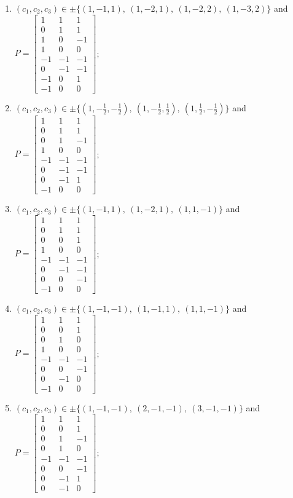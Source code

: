 \begin{enumerate}
\item[(d31)\,\newitem] $(c_1,c_2,c_3)\in \pm\{(1,-1,1),\allowbreak\ (1,-2,1),\allowbreak\ (1,-2,2),\allowbreak\ (1,-3,2)\}$ and $P=\begin{bmatrix}1&1&1\\0&1&1\\1&0&-1\\1&0&0\\-1&-1&-1\\0&-1&-1\\-1&0&1\\-1&0&0\end{bmatrix}$;
\item[(d32)\,\newitem] $(c_1,c_2,c_3)\in \pm\{(1,-\tfrac{1}{2},-\tfrac{1}{2}),\allowbreak\ (1,-\tfrac{1}{2},\tfrac{1}{2}),\allowbreak\ (1,\tfrac{1}{2},-\tfrac{1}{2})\}$ and $P=\begin{bmatrix}1&1&1\\0&1&1\\0&1&-1\\1&0&0\\-1&-1&-1\\0&-1&-1\\0&-1&1\\-1&0&0\end{bmatrix}$;
\item[(d33)\,\newitem] $(c_1,c_2,c_3)\in \pm\{(1,-1,1),\allowbreak\ (1,-2,1),\allowbreak\ (1,1,-1)\}$ and $P=\begin{bmatrix}1&1&1\\0&1&1\\0&0&1\\1&0&0\\-1&-1&-1\\0&-1&-1\\0&0&-1\\-1&0&0\end{bmatrix}$;
\item[(d34)\,\newitem] $(c_1,c_2,c_3)\in \pm\{(1,-1,-1),\allowbreak\ (1,-1,1),\allowbreak\ (1,1,-1)\}$ and $P=\begin{bmatrix}1&1&1\\0&0&1\\0&1&0\\1&0&0\\-1&-1&-1\\0&0&-1\\0&-1&0\\-1&0&0\end{bmatrix}$;
\item[(d35)\,\newitem] $(c_1,c_2,c_3)\in \pm\{(1,-1,-1),\allowbreak\ (2,-1,-1),\allowbreak\ (3,-1,-1)\}$ and $P=\begin{bmatrix}1&1&1\\0&0&1\\0&1&-1\\0&1&0\\-1&-1&-1\\0&0&-1\\0&-1&1\\0&-1&0\end{bmatrix}$;

\end{enumerate}
